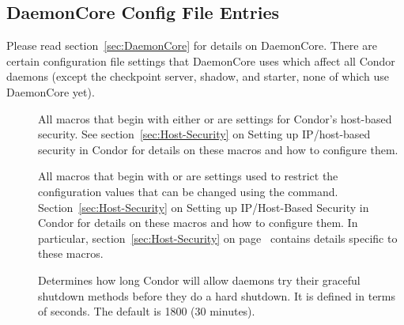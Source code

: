 \subsection{\label{sec:DaemonCore-Config-File-Entries}
DaemonCore Config File Entries}

Please read section~\ref{sec:DaemonCore} for details
on DaemonCore.  There are certain configuration file settings that
DaemonCore uses which affect all Condor daemons (except the checkpoint
server, shadow, and starter, none of which use DaemonCore yet).
\begin{description}
  
\item[] \label{param:HostAllow} All
  macros that begin with either  or
   are settings for Condor's host-based security.
  See section~\ref{sec:Host-Security} on Setting up
  IP/host-based security in Condor for details on these
  macros and how to configure them.

\item[] \label{param:SettableAttrs} All
  macros that begin with  or
   are settings used to restrict the 
  configuration values that can be changed using the  
  command.
  Section~\ref{sec:Host-Security} on Setting up
  IP/Host-Based Security in Condor for details on these
  macros and how to configure them.  
  In particular, section~\ref{sec:Host-Security}
  on page~\pageref{sec:Host-Security} contains details specific to
  these macros.

\item[]
  \label{param:ShutdownGracefulTimeout} Determines how long
  Condor will allow daemons try their graceful shutdown methods
  before they do a hard shutdown.  It is defined in terms of seconds.
  The default is 1800 (30 minutes).


\end{description}
